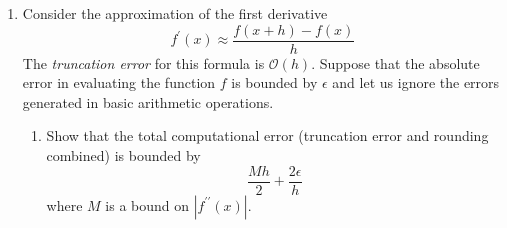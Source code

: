 \documentclass[12pt]{article}
\begin{document}
\begin{enumerate}
\begin{enumerate}
{\bf Solution:}

This can be done by taking the limit of both functions as $x$ approaches $0$, which gives

\begin{align*}
\lim_{x\rightarrow 0} \frac{\cos(x + \delta) - \cos(x)}{\delta} &= \lim_{x\rightarrow 0} \frac{\cos(x)\cos(\delta) - \sin(x)\sin(\delta) -\cos(x)}{\delta}\\
      &= \lim_{x\rightarrow 0} \frac{\cos(x)\left(\cos(\delta)-1\right) - \sin(x)\sin(\delta)}{\delta}\\
      &= \lim_{x\rightarrow 0}\frac{\cos(x)\left(\cos(\delta)-1\right)}{\delta} - \lim_{x\rightarrow 0} \frac{\sin(x)\sin(\delta)}{\delta}\\
      &= \cos(x)\lim_{x\rightarrow 0}\frac{\cos(\delta) - 1}{\delta} - \sin(x)\lim_{x\rightarrow 0}\frac{\sin(\delta)}{\delta}\\
      &= 0\cdot \cos(x) - 1 \cdot \sin(x) = -\sin(x)
\end{align*}
\item Derive $f_{2}(x,\delta)$

{\bf Solution:}

\[
f_{2}(x,\delta) = \cos(x + \delta) - \cos(x) = -2\sin\left(\frac{2x + \delta}{2}\right)\sin\left(\frac{\delta}{2}\right)
\]
\item Write a {\sc Matlab} script which will calculate $g_{1}(x,\delta) = f_{1}(x,\delta)/\delta + \sin(x)$
and $g_{2}(x,\delta) = f_{2}(x,\delta)/\delta + \sin(x)$ for $x = 3$ and $\delta = 10^{-11}$.

{\bf Solution:}

Refer to {\tt prob4.py}

{\tt g1 = -4.4060023643432977e-07}

{\tt g2 = 4.949957110866876e-12}

\item Explain the difference in the results of the two calculations.

{\bf Solution:}

The values of $g_{1}$ and $g_{2}$ should converge to zero as $\delta$ goes to zero.
As can be seen in the results, $g_{2}$ is closer to zero so it therefore provides
a better approximation of the derivative of $\cos(x)$.

\end{enumerate}

\item Consider the approximation of the first derivative
\[
f^{\prime}(x) \approx \frac{f(x+h)-f(x)}{h}
\]
The {\em truncation error} for this formula is $\mathcal{O}(h)$. Suppose that the
absolute error in evaluating the function $f$ is bounded by $\epsilon$ and
let us ignore the errors generated in basic arithmetic operations.
\begin{enumerate}
\item Show that the total computational error (truncation error and rounding combined)
is bounded by
\[
\frac{Mh}{2} + \frac{2\epsilon}{h}
\]
where $M$ is a bound on $\left| f^{\prime\prime}(x)\right|$.


\end{enumerate}
\end{enumerate}
\end{document}
